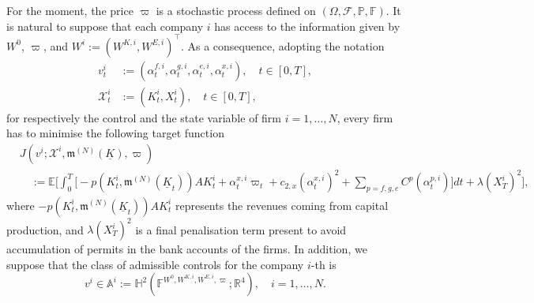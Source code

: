 \documentclass[11pt,twoside]{amsart}
\theoremstyle{definition}
\numberwithin{equation}{section}
\newcommand{\w}{\varpi}
\newcommand{\E}{\mathbb{E}}
\newcommand{\F}{\mathbb{F}}
\newcommand{\R}{\mathbb{R}}
\newcommand{\ItF}{\mathcal{F}}
\newcommand{\prob}{\mathbb{P}}
\begin{document}
For the moment, the price $\w$ is a stochastic process defined on $(\Omega,\ItF,\prob,\F)$. It is natural to suppose that each company $i$ has access to the information given by $W^0$, $\w$, and $W^i:=(W^{K,i},W^{E,i})^\top$. As a consequence, adopting the notation
\begin{align*}
v^i_t 			&:= (\alpha^{f,i}_t,\alpha^{g,i}_t,\alpha^{e,i}_t,\alpha^{x,i}_t),\quad t\in[0,T],\\
\mathcal{X}^i_t &:= (K^i_t, X^i_t), \quad t\in[0,T],
\end{align*}
for respectively the control and the state variable of firm $i = 1,\dots,N$, every firm has to minimise the following target function
\begin{align}
\label{eqn: target companies N}
&J(v^i;\mathcal{X}^i,\mathfrak{m}^{(N)}(\underline{K}), \w) \\
\nonumber& \quad:= \E\Bigg[\int_0^T \bigg[-p(K^i_t,\mathfrak{m}^{(N)}(\underline{K}_t)) AK^i_t + \alpha^{x,i}_t \w_t + c_{2,x}(\alpha^{x,i}_t)^2 + \sum_{p = f,g,e}C^p(\alpha^{p,i}_t)\bigg] dt + \lambda (X^i_T)^2\Bigg],
\end{align}
where $-p(K^i_t,\mathfrak{m}^{(N)}(\underline{K}_t)) AK^i_t$ represents the revenues coming from capital production, and $\lambda(X^i_T)^2$ is a final penalisation term present to avoid accumulation of permits in the bank accounts of the firms. In addition, we suppose that the class of admissible controls for the company $i$-th is
\begin{equation*} 
v^i \in \mathbb{A}^i := \mathbb{H}^2( \F^{W^0, W^{K,i}, W^{E,i} ,\w};\R^4),\quad i = 1,\dots, N.
\end{equation*}
\end{document}
